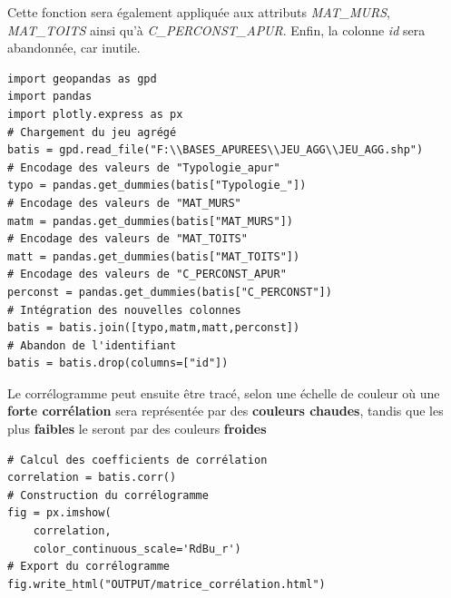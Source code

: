 \documentclass[
  11pt,
  french,
]{article}
\begin{document}
Cette fonction sera également appliquée aux attributs \emph{MAT\_MURS},
\emph{MAT\_TOITS} ainsi qu'à \emph{C\_PERCONST\_APUR}. Enfin, la colonne
\emph{id} sera abandonnée, car inutile.

\begin{tcolorbox}[title= Préparation des données ,colback=boitecode]
\begin{lstlisting}[style=code]
import geopandas as gpd
import pandas
import plotly.express as px
# Chargement du jeu agrégé
batis = gpd.read_file("F:\\BASES_APUREES\\JEU_AGG\\JEU_AGG.shp")
# Encodage des valeurs de "Typologie_apur"
typo = pandas.get_dummies(batis["Typologie_"])
# Encodage des valeurs de "MAT_MURS"
matm = pandas.get_dummies(batis["MAT_MURS"])
# Encodage des valeurs de "MAT_TOITS"
matt = pandas.get_dummies(batis["MAT_TOITS"])
# Encodage des valeurs de "C_PERCONST_APUR"
perconst = pandas.get_dummies(batis["C_PERCONST"])
# Intégration des nouvelles colonnes
batis = batis.join([typo,matm,matt,perconst])
# Abandon de l'identifiant
batis = batis.drop(columns=["id"])\end{lstlisting}
\end{tcolorbox}

Le corrélogramme peut ensuite être tracé, selon une échelle de couleur
où une \textbf{forte corrélation} sera représentée par des
\textbf{couleurs chaudes}, tandis que les plus \textbf{faibles} le
seront par des couleurs \textbf{froides}

\begin{tcolorbox}[title= Construction du corrélogramme ,colback=boitecode]
\begin{lstlisting}[style=code]
# Calcul des coefficients de corrélation
correlation = batis.corr()
# Construction du corrélogramme
fig = px.imshow(
    correlation,
    color_continuous_scale='RdBu_r')
# Export du corrélogramme
fig.write_html("OUTPUT/matrice_corrélation.html")\end{lstlisting}
\end{tcolorbox}
\end{document}
